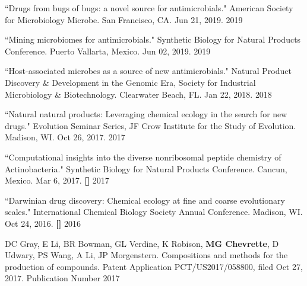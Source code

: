 \begin{cvpubs}

\cvpub
{``Drugs from bugs of bugs: a novel source for antimicrobials." American Society for Microbiology Microbe. San Francisco, CA. Jun 21, 2019.}
{2019}

\end{cvpubs} \begin{cvpubs}

\cvpub
{``Mining microbiomes for antimicrobials." Synthetic Biology for Natural Products Conference. Puerto Vallarta, Mexico. Jun 02, 2019.}
{2019}

\cvpub
{``Host-associated microbes as a source of new antimicrobials." Natural Product Discovery \& Development in the Genomic Era, Society for Industrial Microbiology \& Biotechnology. Clearwater Beach, FL. Jan 22, 2018.}
{2018}

\cvpub
{``Natural natural products: Leveraging chemical ecology in the search for new drugs." Evolution Seminar Series, JF Crow Institute for the Study of Evolution. Madison, WI. Oct 26, 2017.}
{2017}

\cvpub
{``Computational insights into the diverse nonribosomal peptide chemistry of Actinobacteria." Synthetic Biology for Natural Products Conference. Cancun, Mexico. Mar 6, 2017. \linebreak \textbf{[\textit{}]}}
{2017}

\cvpub
{``Darwinian drug discovery: Chemical ecology at fine and coarse evolutionary scales." International Chemical Biology Society Annual Conference. Madison, WI. Oct 24, 2016. \linebreak \textbf{[\textit{}]}}
{2016}

\end{cvpubs}


\begin{cvpubs}

\cvpub
{DC Gray, E Li, BR Bowman, GL Verdine, K Robison, \textbf{MG Chevrette}, D Udwary, PS Wang, A Li, JP Morgenstern. Compositions and methods for the production of compounds. Patent Application PCT/US2017/058800, filed Oct 27, 2017. Publication Number  \textbf{\textit{}}}
{2017}

\end{cvpubs}

